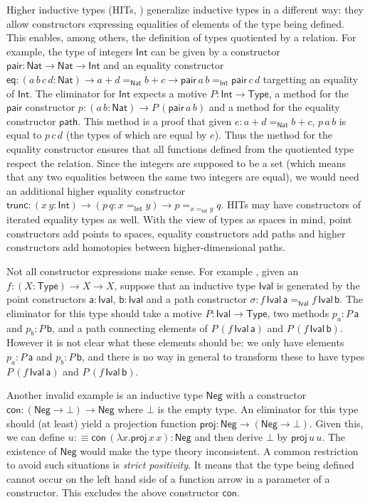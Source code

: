 \documentclass[dvipsnames]{lmcs} %
\newcommand{\ra}{\rightarrow}
\newcommand{\Nat}{\mathsf{Nat}}
\newcommand{\proj}{\mathsf{proj}}
\newcommand{\1}{\mathsf{1}} \renewcommand{\Pr}{\mathsf{Pr}}
\newcommand{\con}{\mathsf{con}}
\newcommand{\Int}{\mathsf{Int}}
\theoremstyle{plain}\newtheorem{satz}[thm]{Satz} %
\begin{document}
Higher inductive types (HITs, \cite[Chapter 6]{HoTTbook}) generalize inductive
types in a different way: they allow constructors expressing equalities of
elements of the type being defined. This enables, among others, the definition
of types quotiented by a relation. For example, the type of integers $\Int$ can
be given by a constructor $\mathsf{pair}:\Nat\ra\Nat\ra\Int$ and an equality
constructor $\mathsf{eq}:(a\,b\,c\,d:\Nat)\ra a+d=_\Nat b+c\ra
\mathsf{pair}\,a\,b=_{\Int}\mathsf{pair}\,c\,d$ targetting an equality of
$\Int$. The eliminator for $\Int$ expects a motive $P:\Int\ra\mathsf{Type}$, a
method for the $\mathsf{pair}$ constructor $p:(a\,b:\Nat)\ra
P\,(\mathsf{pair}\,a\,b)$ and a method for the equality constructor
$\mathsf{path}$. This method is a proof that given $e:a+d=_\Nat b+c$, $p\,a\,b$
is equal to $p\,c\,d$ (the types of which are equal by $e$). Thus the method for
the equality constructor ensures that all functions defined from the quotiented
type respect the relation. Since the integers are supposed to be a set (which
means that any two equalities between the same two integers are equal), we would
need an additional higher equality constructor
$\mathsf{trunc}:(x\,y:\Int)\ra(p\,q:x=_\Int y)\ra p=_{x=_\Int y} q$.  HITs may
have constructors of iterated equality types as well. With the view of types as
spaces in mind, point constructors add points to spaces, equality constructors
add paths and higher constructors add homotopies between higher-dimensional paths.

Not all constructor expressions make sense. For example \cite[Example
  6.13.1]{HoTTbook}, given an $f:(X:\mathsf{Type})\ra X\ra X$, suppose that an
inductive type $\mathsf{Ival}$ is generated by the point constructors
$\mathsf{a}:\mathsf{Ival}$, $\mathsf{b}:\mathsf{Ival}$ and a path
constructor $\sigma:f\,\mathsf{Ival}\,\mathsf{a}
=_{\mathsf{Ival}}f\,\mathsf{Ival}\,\mathsf{b}$. The eliminator for this type
should take a motive $P:\mathsf{Ival}\ra\mathsf{Type}$, two methods $p_a :
P\,\mathsf{a}$ and $p_b : P\,\mathsf{b}$, and a path connecting
elements of $P\,(f\,\mathsf{Ival}\,\mathsf{a})$ and
$P\,(f\,\mathsf{Ival}\,\mathsf{b})$. However it is not clear what these
elements should be: we only have elements $p_a:P\,\mathsf{a}$ and
$p_b:P\,\mathsf{b}$, and there is no way in general to transform these
to have types $P\,(f\,\mathsf{Ival}\,\mathsf{a})$ and
$P\,(f\,\mathsf{Ival}\,\mathsf{b})$.

Another invalid example is an inductive type $\mathsf{Neg}$ with a constructor
$\con:(\mathsf{Neg} \ra \bot) \ra \mathsf{Neg}$ where $\bot$ is the empty
type. An eliminator for this type should (at least) yield a projection function
$\proj: \mathsf{Neg} \ra (\mathsf{Neg} \ra \bot)$. Given this, we can define $u
:\equiv \con\,(\lambda x . \proj\, x\,x):\mathsf{Neg}$ and then derive $\bot$ by
$\proj\,u\,u$. The existence of $\mathsf{Neg}$ would make the type theory
inconsistent. A common restriction to avoid such situations is \emph{strict
  positivity}. It means that the type being defined cannot occur on the left
hand side of a function arrow in a parameter of a constructor. This excludes the
above constructor $\con$.
\end{document}
